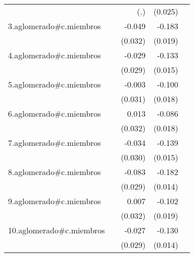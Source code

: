 {\begin{longtable}{l*{4}{D{.}{.}{-1}}}
            &                     &         (.)         &     (0.025)         &                     \\
\addlinespace
3.aglomerado#c.miembros&                     &      -0.049         &      -0.183\sym{***}&                     \\
            &                     &     (0.032)         &     (0.019)         &                     \\
\addlinespace
4.aglomerado#c.miembros&                     &      -0.029         &      -0.133\sym{***}&                     \\
            &                     &     (0.029)         &     (0.015)         &                     \\
\addlinespace
5.aglomerado#c.miembros&                     &      -0.003         &      -0.100\sym{***}&                     \\
            &                     &     (0.031)         &     (0.018)         &                     \\
\addlinespace
6.aglomerado#c.miembros&                     &       0.013         &      -0.086\sym{***}&                     \\
            &                     &     (0.032)         &     (0.018)         &                     \\
\addlinespace
7.aglomerado#c.miembros&                     &      -0.034         &      -0.139\sym{***}&                     \\
            &                     &     (0.030)         &     (0.015)         &                     \\
\addlinespace
8.aglomerado#c.miembros&                     &      -0.083\sym{**} &      -0.182\sym{***}&                     \\
            &                     &     (0.029)         &     (0.014)         &                     \\
\addlinespace
9.aglomerado#c.miembros&                     &       0.007         &      -0.102\sym{***}&                     \\
            &                     &     (0.032)         &     (0.019)         &                     \\
\addlinespace
10.aglomerado#c.miembros&                     &      -0.027         &      -0.130\sym{***}&                     \\
            &                     &     (0.029)         &     (0.014)         &                     \\

\end{longtable}}
